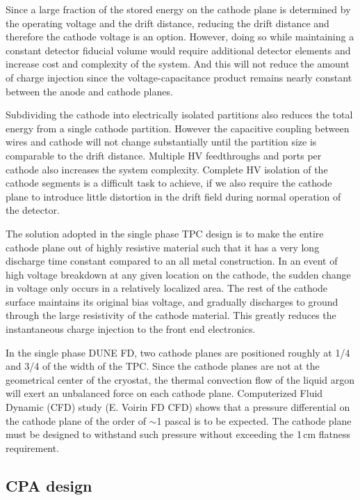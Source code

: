Since  a large fraction of the stored energy on the cathode plane is determined by the operating voltage and the drift distance, reducing the drift distance and therefore the cathode voltage is an option.  However, doing so while maintaining a constant detector fiducial volume would require additional detector elements and increase cost and complexity of the system.  And this will not reduce the amount of charge injection since the voltage-capacitance product remains nearly constant between the anode and cathode planes.

Subdividing the cathode into electrically isolated partitions also reduces the total energy from a single cathode partition. However the capacitive coupling between wires and cathode will not change substantially until the partition size is comparable to the drift distance. Multiple HV feedthroughs and ports per cathode also increases the system complexity. Complete HV isolation of the cathode segments is a difficult task to achieve, if we also require the cathode plane to introduce little distortion in the drift field during normal operation of the detector. 

The solution adopted in the single phase TPC design is to make the entire cathode plane out of highly resistive material such that it has a very long discharge time constant compared to an all metal construction.  In an event of high voltage breakdown at any given location on the cathode, the sudden change in voltage only occurs in a relatively localized area.  The rest of the cathode surface maintains its original bias voltage, and gradually discharges to ground through the large resistivity of the cathode material.  This greatly reduces the instantaneous charge injection to the front end electronics.

In the single phase DUNE FD, two cathode planes are positioned roughly at 1/4 and 3/4 of the width of the TPC.  Since the cathode planes are not at the geometrical center of the cryostat, the thermal convection flow of the liquid argon will exert an unbalanced force on each cathode plane. Computerized Fluid Dynamic (CFD) study (E. Voirin FD CFD)  shows that a pressure differential on the cathode plane of the order of $\sim$1 pascal is to be expected.  The cathode plane must be designed to withstand such pressure without exceeding the 1\,cm flatness requirement.




\subsection{CPA design}

